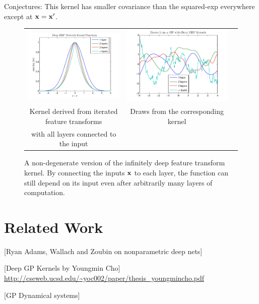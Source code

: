 \documentclass{article}
\begin{document}
Conjectures:  This kernel has smaller covariance than the squared-exp everywhere except at ${\bf{x}} = {\bf{x}}'$.


\begin{figure}
\centering
\begin{tabular}{ccc}
\includegraphics[width=0.5\columnwidth, clip, trim = 0cm 0cm 0cm 0.61cm]{figures/deep_kernel_connected} &
\includegraphics[width=0.5\columnwidth, clip, trim = 0cm 0cm 0cm 0.61cm]{figures/deep_kernel_connected_draws} \\
Kernel derived from iterated feature transforms & Draws from the corresponding kernel \\
with all layers connected to the input &
\end{tabular}
\caption{A non-degenerate version of the infinitely deep feature transform kernel.  By connecting the inputs ${\bf{x}}$ to each layer, the function can still depend on its input even after arbitrarily many layers of computation.}
\label{fig:deep_kernel_connected}
\end{figure}


\section{Related Work}

[Ryan Adams, Wallach and Zoubin on nonparametric deep nets]

[Deep GP Kernels by Youngmin Cho]
\url{http://cseweb.ucsd.edu/~yoc002/paper/thesis_youngmincho.pdf}

[GP Dynamical systems]
\end{document}
